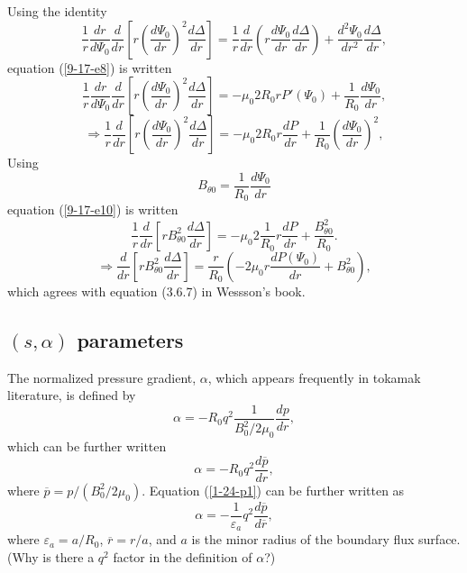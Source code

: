 \documentclass{llncs}
\begin{document}
Using the identity
\begin{equation}
  \frac{1}{r}  \frac{d r}{d \Psi_0}  \frac{d}{d r} \left[ r \left( \frac{d
  \Psi_0}{d r} \right)^2 \frac{d \Delta}{d r} \right] = \frac{1}{r} 
  \frac{d}{d r} \left( r \frac{d \Psi_0}{d r}  \frac{d \Delta}{d r}  \right) +
  \frac{d^2 \Psi_0}{d r^2}  \frac{d \Delta}{d r},
\end{equation}
equation (\ref{9-17-e8}) is written
\begin{equation}
  \frac{1}{r}  \frac{d r}{d \Psi_0}  \frac{d}{d r} \left[ r \left( \frac{d
  \Psi_0}{d r} \right)^2 \frac{d \Delta}{d r} \right] = - \mu_0 2 R_0 r P'
  (\Psi_0) + \frac{1}{R_0}  \frac{d \Psi_0}{d r},
\end{equation}
\begin{equation}
  \label{9-17-e10} \Rightarrow \frac{1}{r}  \frac{d}{d r} \left[ r \left(
  \frac{d \Psi_0}{d r} \right)^2 \frac{d \Delta}{d r} \right] = - \mu_0 2 R_0
  r \frac{d P}{d r} + \frac{1}{R_0} \left(  \frac{d \Psi_0}{d r} \right)^2,
\end{equation}
Using
\begin{equation}
  B_{\theta 0} = \frac{1}{R_0}  \frac{d \Psi_0}{d r}
\end{equation}
equation (\ref{9-17-e10}) is written
\begin{equation}
  \frac{1}{r}  \frac{d}{d r} \left[ r B_{\theta 0}^2 \frac{d \Delta}{d r}
  \right] = - \mu_0 2 \frac{1}{R_0} r \frac{d P}{d r} + \frac{B_{\theta
  0}^2}{R_0} .
\end{equation}
\begin{equation}
  \Rightarrow \frac{d}{d r} \left[ r B_{\theta 0}^2 \frac{d \Delta}{d r}
  \right] = \frac{r}{R_0} \left( - 2 \mu_0 r \frac{d P (\Psi_0)}{d r} +
  B_{\theta 0}^2 \right),
\end{equation}
which agrees with equation (3.6.7) in Wessson's book{\cite{wesson2004}}.

\subsection{$(s, \alpha)$ parameters}

The normalized pressure gradient, $\alpha$, which appears frequently in
tokamak literature, is defined by{\cite{berk1995}}
\begin{equation}
  \alpha = - R_0 q^2 \frac{1}{B^2_0 / 2 \mu_0}  \frac{d p}{d r},
\end{equation}
which can be further written
\begin{equation}
  \label{1-24-p1} \alpha = - R_0 q^2  \frac{d \overline{p}}{d r},
\end{equation}
where $\overline{p} = p / (B_0^2 / 2 \mu_0)$. Equation (\ref{1-24-p1}) can be
further written as
\begin{equation}
  \alpha = - \frac{1}{\varepsilon_a} q^2  \frac{d \overline{p}}{d
  \overline{r}},
\end{equation}
where $\varepsilon_a = a / R_0$, $\overline{r} = r / a$, and $a$ is the minor
radius of the boundary flux surface. (Why is there a $q^2$ factor in the
definition of $\alpha$?)
\end{document}

